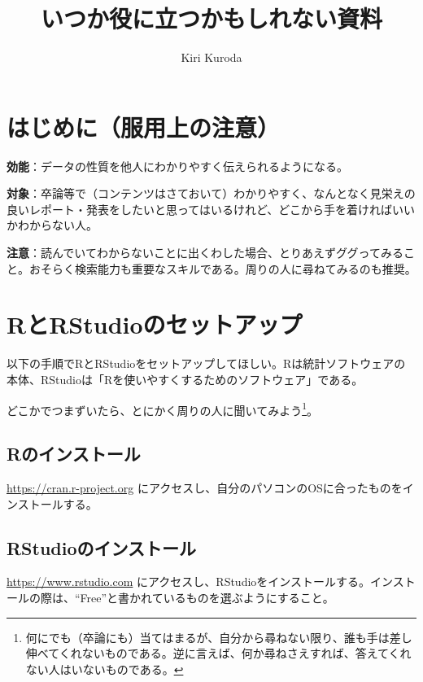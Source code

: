 \documentclass[]{book}
\title{いつか役に立つかもしれない資料}
\author{Kiri Kuroda}
\date{}
\let\rmarkdownfootnote\footnote%
\def\footnote{\protect\rmarkdownfootnote}
\begin{document}
\maketitle

{
\setcounter{tocdepth}{1}
\tableofcontents
}
\chapter*{はじめに（服用上の注意）}

\textbf{効能}：データの性質を他人にわかりやすく伝えられるようになる。

\textbf{対象}：卒論等で（コンテンツはさておいて）わかりやすく、なんとなく見栄えの良いレポート・発表をしたいと思ってはいるけれど、どこから手を着ければいいかわからない人。

\textbf{注意}：読んでいてわからないことに出くわした場合、とりあえずググってみること。おそらく検索能力も重要なスキルである。周りの人に尋ねてみるのも推奨。

\chapter*{RとRStudioのセットアップ}\label{rrstudio}

以下の手順でRとRStudioをセットアップしてほしい。Rは統計ソフトウェアの本体、RStudioは「Rを使いやすくするためのソフトウェア」である。

どこかでつまずいたら、とにかく周りの人に聞いてみよう\footnote{何にでも（卒論にも）当てはまるが、自分から尋ねない限り、誰も手は差し伸べてくれないものである。逆に言えば、何か尋ねさえすれば、答えてくれない人はいないものである。}。

\section{Rのインストール}\label{r}

\url{https://cran.r-project.org}
にアクセスし、自分のパソコンのOSに合ったものをインストールする。

\section{RStudioのインストール}\label{rstudio}

\url{https://www.rstudio.com}
にアクセスし、RStudioをインストールする。インストールの際は、``Free''と書かれているものを選ぶようにすること。
\end{document}
